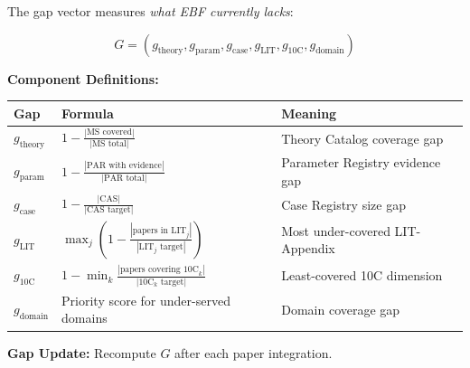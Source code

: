 \begin{tcolorbox}[colback=blue!5!white, colframe=blue!75!black,
    title=\textbf{Definition 6: Gap Vector $G = (g_1, \ldots, g_6)$ (EBF Needs)}]

The gap vector measures \textit{what EBF currently lacks}:

\begin{equation}
G = (g_{\text{theory}}, g_{\text{param}}, g_{\text{case}}, g_{\text{LIT}}, g_{\text{10C}}, g_{\text{domain}})
\end{equation}

\textbf{Component Definitions:}

\begin{tabular}{@{}llp{6cm}@{}}
\toprule
\textbf{Gap} & \textbf{Formula} & \textbf{Meaning} \\
\midrule
$g_{\text{theory}}$ & $1 - \frac{|\text{MS covered}|}{|\text{MS total}|}$ & Theory Catalog coverage gap \\
$g_{\text{param}}$ & $1 - \frac{|\text{PAR with evidence}|}{|\text{PAR total}|}$ & Parameter Registry evidence gap \\
$g_{\text{case}}$ & $1 - \frac{|\text{CAS}|}{|\text{CAS target}|}$ & Case Registry size gap \\
$g_{\text{LIT}}$ & $\max_j \left(1 - \frac{|\text{papers in LIT}_j|}{|\text{LIT}_j \text{ target}|}\right)$ & Most under-covered LIT-Appendix \\
$g_{\text{10C}}$ & $1 - \min_k \frac{|\text{papers covering 10C}_k|}{|\text{10C}_k \text{ target}|}$ & Least-covered 10C dimension \\
$g_{\text{domain}}$ & Priority score for under-served domains & Domain coverage gap \\
\bottomrule
\end{tabular}

\textbf{Gap Update:} Recompute $G$ after each paper integration.

\end{tcolorbox}

